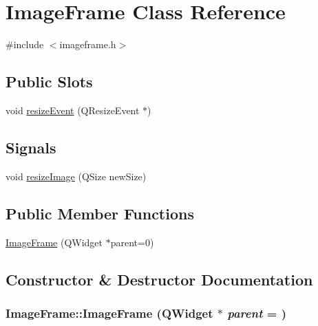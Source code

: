 \hypertarget{classImageFrame}{
\section{ImageFrame Class Reference}
\label{classImageFrame}
}


{\ttfamily \#include $<$imageframe.h$>$}

\subsection*{Public Slots}
\begin{DoxyCompactItemize}
\item 
void \hyperlink{classImageFrame_a03c4a3c033846294a43a2a87eb0b5f30}{resizeEvent} (QResizeEvent $\ast$)
\end{DoxyCompactItemize}
\subsection*{Signals}
\begin{DoxyCompactItemize}
\item 
void \hyperlink{classImageFrame_afc5c795cc06bab2f82d286084dc8eb14}{resizeImage} (QSize newSize)
\end{DoxyCompactItemize}
\subsection*{Public Member Functions}
\begin{DoxyCompactItemize}
\item 
\hyperlink{classImageFrame_a4691aecc4a0685f30f18941b1354fe66}{ImageFrame} (QWidget $\ast$parent=0)
\end{DoxyCompactItemize}


\subsection{Constructor \& Destructor Documentation}
\hypertarget{classImageFrame_a4691aecc4a0685f30f18941b1354fe66}{
\subsubsection[{ImageFrame}]{\setlength{\rightskip}{0pt plus 5cm}ImageFrame::ImageFrame (QWidget $\ast$ {\em parent} = {})}}
\label{classImageFrame_a4691aecc4a0685f30f18941b1354fe66}



